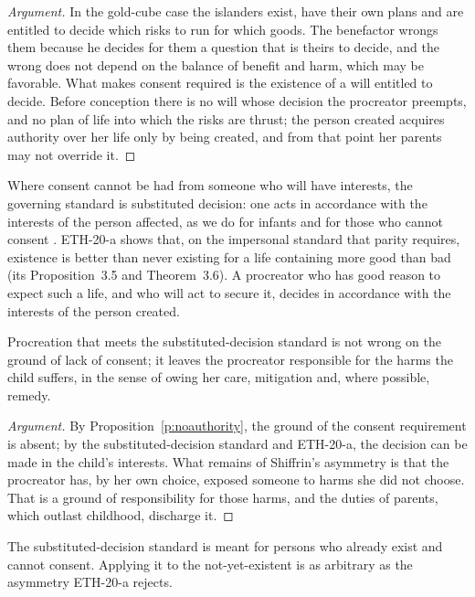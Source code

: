 \documentclass{situationist-preprint}
\begin{document}
\begin{proof}[Argument]
In the gold-cube case the islanders exist, have their own plans and are entitled to decide which risks to run for which goods. The benefactor wrongs them because he decides for them a question that is theirs to decide, and the wrong does not depend on the balance of benefit and harm, which may be favorable. What makes consent required is the existence of a will entitled to decide. Before conception there is no will whose decision the procreator preempts, and no plan of life into which the risks are thrust; the person created acquires authority over her life only by being created, and from that point her parents may not override it.
\end{proof}

Where consent cannot be had from someone who will have interests, the governing standard is substituted decision: one acts in accordance with the interests of the person affected, as we do for infants and for those who cannot consent \citep[cf.][]{Harman2004}. ETH-20-a shows that, on the impersonal standard that parity requires, existence is better than never existing for a life containing more good than bad (its Proposition~3.5 and Theorem~3.6). A procreator who has good reason to expect such a life, and who will act to secure it, decides in accordance with the interests of the person created.

\begin{proposition}\label{p:residue}
Procreation that meets the substituted-decision standard is not wrong on the ground of lack of consent; it leaves the procreator responsible for the harms the child suffers, in the sense of owing her care, mitigation and, where possible, remedy.
\end{proposition}

\begin{proof}[Argument]
By Proposition~\ref{p:noauthority}, the ground of the consent requirement is absent; by the substituted-decision standard and ETH-20-a, the decision can be made in the child's interests. What remains of Shiffrin's asymmetry is that the procreator has, by her own choice, exposed someone to harms she did not choose. That is a ground of responsibility for those harms, and the duties of parents, which outlast childhood, discharge it.
\end{proof}

\begin{objection}
The substituted-decision standard is meant for persons who already exist and cannot consent. Applying it to the not-yet-existent is as arbitrary as the asymmetry ETH-20-a rejects.
\end{objection}
\end{document}
